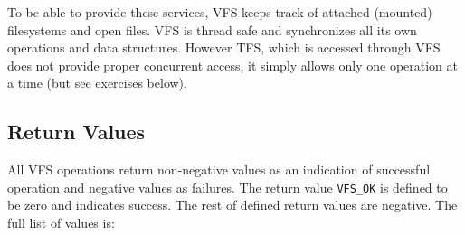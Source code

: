 \documentclass[twoside,a4paper]{report}
\begin{document}
To be able to provide these services, VFS keeps track of attached
(mounted) filesystems and open files. VFS is thread safe and
synchronizes all its own operations and data structures. However TFS,
which is accessed through VFS does not provide proper concurrent
access, it simply allows only one operation at a time (but see
exercises below).

\subsection{Return Values}


All VFS operations return non-negative values as an indication of
successful operation and negative values as failures. The return
value \texttt{VFS\_OK} is defined to be zero and indicates success.
The rest of defined return values are negative. The full list of
values is:
\end{document}
